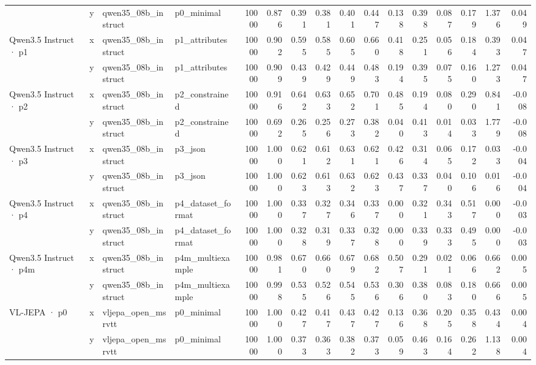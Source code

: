 \begin{tabular}{llllrrrrrrrrrrrr}
 & y & qwen35\_08b\_instruct & p0\_minimal & 10000 & 0.876 & 0.391 & 0.381 & 0.401 & 0.447 & 0.138 & 0.398 & 0.087 & 0.179 & 1.376 & 0.049 \\
\cline{1-16}
\multirow[t]{2}{*}{Qwen3.5 Instruct · p1} & x & qwen35\_08b\_instruct & p1\_attributes & 10000 & 0.902 & 0.595 & 0.585 & 0.605 & 0.660 & 0.418 & 0.251 & 0.056 & 0.184 & 0.393 & 0.047 \\
 & y & qwen35\_08b\_instruct & p1\_attributes & 10000 & 0.909 & 0.439 & 0.429 & 0.449 & 0.483 & 0.194 & 0.395 & 0.075 & 0.160 & 1.273 & 0.047 \\
\cline{1-16}
\multirow[t]{2}{*}{Qwen3.5 Instruct · p2} & x & qwen35\_08b\_instruct & p2\_constrained & 10000 & 0.916 & 0.642 & 0.633 & 0.652 & 0.701 & 0.485 & 0.194 & 0.080 & 0.290 & 0.841 & -0.008 \\
 & y & qwen35\_08b\_instruct & p2\_constrained & 10000 & 0.692 & 0.265 & 0.256 & 0.273 & 0.382 & 0.040 & 0.413 & 0.014 & 0.033 & 1.779 & -0.008 \\
\cline{1-16}
\multirow[t]{2}{*}{Qwen3.5 Instruct · p3} & x & qwen35\_08b\_instruct & p3\_json & 10000 & 1.000 & 0.621 & 0.612 & 0.631 & 0.621 & 0.426 & 0.314 & 0.065 & 0.172 & 0.033 & -0.004 \\
 & y & qwen35\_08b\_instruct & p3\_json & 10000 & 1.000 & 0.623 & 0.613 & 0.632 & 0.623 & 0.437 & 0.337 & 0.040 & 0.106 & 0.016 & -0.004 \\
\cline{1-16}
\multirow[t]{2}{*}{Qwen3.5 Instruct · p4} & x & qwen35\_08b\_instruct & p4\_dataset\_format & 10000 & 1.000 & 0.337 & 0.327 & 0.346 & 0.337 & 0.000 & 0.321 & 0.343 & 0.517 & 0.000 & -0.003 \\
 & y & qwen35\_08b\_instruct & p4\_dataset\_format & 10000 & 1.000 & 0.328 & 0.319 & 0.337 & 0.328 & 0.000 & 0.339 & 0.333 & 0.495 & 0.000 & -0.003 \\
\cline{1-16}
\multirow[t]{2}{*}{Qwen3.5 Instruct · p4m} & x & qwen35\_08b\_instruct & p4m\_multiexample & 10000 & 0.981 & 0.670 & 0.660 & 0.679 & 0.682 & 0.507 & 0.291 & 0.021 & 0.066 & 0.662 & 0.005 \\
 & y & qwen35\_08b\_instruct & p4m\_multiexample & 10000 & 0.998 & 0.535 & 0.526 & 0.545 & 0.536 & 0.306 & 0.380 & 0.083 & 0.180 & 0.666 & 0.005 \\
\cline{1-16}
\multirow[t]{2}{*}{VL-JEPA · p0} & x & vljepa\_open\_msrvtt & p0\_minimal & 10000 & 1.000 & 0.427 & 0.417 & 0.437 & 0.427 & 0.136 & 0.368 & 0.205 & 0.358 & 0.434 & 0.004 \\
 & y & vljepa\_open\_msrvtt & p0\_minimal & 10000 & 1.000 & 0.373 & 0.363 & 0.382 & 0.373 & 0.059 & 0.463 & 0.164 & 0.262 & 1.138 & 0.004 \\

\end{tabular}

